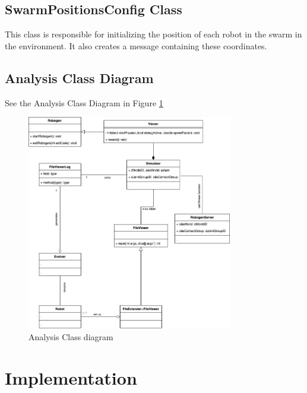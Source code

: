 \documentclass[11pt,a4paper]{article}
\begin{document}
\subsection{SwarmPositionsConfig Class}

This class is responsible for initializing the position of each robot in the swarm in the environment.
It also creates a message containing these coordinates.

\subsection{Analysis Class Diagram}
See the Analysis Class Diagram in Figure \ref{fig:analysis-class-diagram}

\begin{figure}[htpb]
    \centering
    \includegraphics[width=0.8\textwidth]{1}
    \caption{Analysis Class diagram}
    \label{fig:analysis-class-diagram}
\end{figure}

\section{Implementation}
\end{document}
